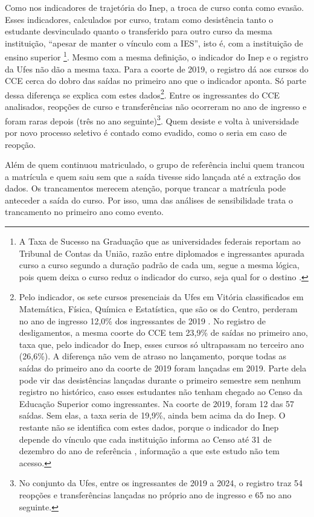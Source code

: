 \documentclass[12pt,a4paper]{article}
\begin{document}
Como nos indicadores de trajetória do Inep, a troca de curso conta como evasão. Esses indicadores, calculados por curso, tratam como desistência tanto o estudante desvinculado quanto o transferido para outro curso da mesma instituição, ``apesar de manter o vínculo com a IES'', isto é, com a instituição de ensino superior \citep{inep2017metodologia}\footnote{A Taxa de Sucesso na Graduação que as universidades federais reportam ao Tribunal de Contas da União, razão entre diplomados e ingressantes apurada curso a curso segundo a duração padrão de cada um, segue a mesma lógica, pois quem deixa o curso reduz o indicador do curso, seja qual for o destino \citep{tcu2010orientacoes}.}. Mesmo com a mesma definição, o indicador do Inep e o registro da Ufes não dão a mesma taxa. Para a coorte de 2019, o registro dá aos cursos do CCE cerca do dobro das saídas no primeiro ano que o indicador aponta. Só parte dessa diferença se explica com estes dados\footnote{Pelo indicador, os sete cursos presenciais da Ufes em Vitória classificados em Matemática, Física, Química e Estatística, que são os do Centro, perderam no ano de ingresso 12,0\% dos ingressantes de 2019 \citep{inep2025trajetoria}. No registro de desligamentos, a mesma coorte do CCE tem 23,9\% de saídas no primeiro ano, taxa que, pelo indicador do Inep, esses cursos só ultrapassam no terceiro ano (26,6\%). A diferença não vem de atraso no lançamento, porque todas as saídas do primeiro ano da coorte de 2019 foram lançadas em 2019. Parte dela pode vir das desistências lançadas durante o primeiro semestre sem nenhum registro no histórico, caso esses estudantes não tenham chegado ao Censo da Educação Superior como ingressantes. Na coorte de 2019, foram 12 das 57 saídas. Sem elas, a taxa seria de 19,9\%, ainda bem acima da do Inep. O restante não se identifica com estes dados, porque o indicador do Inep depende do vínculo que cada instituição informa ao Censo até 31 de dezembro do ano de referência \citep{inep2017metodologia}, informação a que este estudo não tem acesso.}. Entre os ingressantes do CCE analisados, reopções de curso e transferências não ocorreram no ano de ingresso e foram raras depois (três no ano seguinte)\footnote{No conjunto da Ufes, entre os ingressantes de 2019 a 2024, o registro traz 54 reopções e transferências lançadas no próprio ano de ingresso e 65 no ano seguinte.}. Quem desiste e volta à universidade por novo processo seletivo é contado como evadido, como o seria em caso de reopção.

Além de quem continuou matriculado, o grupo de referência inclui quem trancou a matrícula e quem saiu sem que a saída tivesse sido lançada até a extração dos dados. Os trancamentos merecem atenção, porque trancar a matrícula pode anteceder a saída do curso. Por isso, uma das análises de sensibilidade trata o trancamento no primeiro ano como evento.
\end{document}
